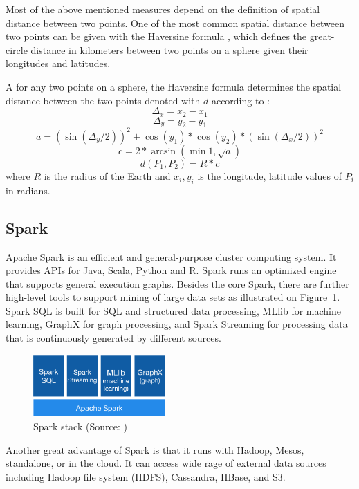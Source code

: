 Most of the above mentioned measures depend on the definition of spatial distance between two points. One of the most common spatial distance between two points can be given with the Haversine formula \cite{haversine}, which  defines the great-circle distance in kilometers between two points on a sphere given their longitudes and latitudes.

\begin{definition}
A for any two points on a sphere, the Haversine formula determines the spatial distance between the two points denoted with $d$ according to \cite{haversine}:
    \[\Delta_{x} = x_{2} - x_{1}\]
    \[\Delta_{y} = y_{2} - y_{1}\]
    \[a = (\sin(\Delta_{y}/2))^2 + \cos{(y_{1})} * \cos{(y_{2})} * (\sin{(\Delta_{x}/2)})^2 \]
    \[c = 2 * \arcsin{(\min{1,\sqrt{a}})}\]
    \[d(P_{1}, P_{2}) = R * c\]
    where $R$ is the radius of the Earth and $x_{i}, y_{i}$ is the longitude, latitude values of $P_{i}$ in radians.
\end{definition}

\subsection{Spark}
Apache Spark is an efficient and general-purpose cluster computing system. It provides APIs for Java, Scala, Python and R. Spark runs an optimized engine that supports general execution graphs. Besides the core Spark, there are further high-level tools to support mining of large data sets as illustrated on Figure~\ref{fig:spark}. Spark SQL is built for SQL and structured data processing, MLlib for machine learning, GraphX for graph processing, and Spark Streaming for processing data that is continuously generated by different sources.
\begin{figure}[h]
    \centering
    \includegraphics[width=0.45\textwidth]{images/spark-stack}
    \caption{Spark stack (Source: \cite{spark})}
    \label{fig:spark}
\end{figure}

Another great advantage of Spark is that it runs with Hadoop, Mesos, standalone, or in the cloud. It can access wide rage of external data sources including Hadoop file system (HDFS), Cassandra, HBase, and S3. 

